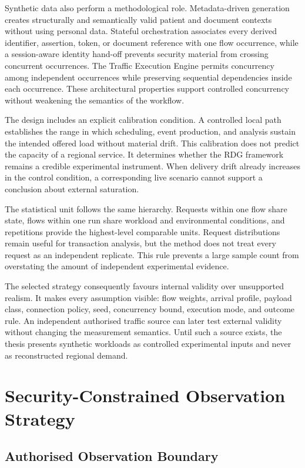 \noindent Synthetic data also perform a methodological role. Metadata-driven generation
creates structurally and semantically valid patient and document contexts without
using personal data. Stateful orchestration associates every derived identifier,
assertion, token, or document reference with one flow occurrence, while a
session-aware identity hand-off prevents security material from crossing
concurrent occurrences. The Traffic Execution Engine permits concurrency
among independent occurrences while preserving sequential dependencies inside
each occurrence. These architectural properties support controlled concurrency
without weakening the semantics of the workflow.

\noindent The design includes an explicit calibration condition. A controlled local path
establishes the range in which scheduling, event production, and analysis sustain
the intended offered load without material drift. This calibration does not
predict the capacity of a regional service. It determines whether the RDG
framework remains a credible experimental instrument. When delivery drift
already increases in the control condition, a corresponding live scenario cannot
support a conclusion about external saturation.

\noindent The statistical unit follows the same hierarchy. Requests within one flow share
state, flows within one run share workload and environmental conditions, and
repetitions provide the highest-level comparable units. Request distributions
remain useful for transaction analysis, but the method does not treat every
request as an independent replicate. This rule prevents a large sample count from
overstating the amount of independent experimental evidence.

\noindent The selected strategy consequently favours internal validity over unsupported
realism. It makes every assumption visible: flow weights, arrival profile,
payload class, connection policy, seed, concurrency bound, execution mode, and
outcome rule. An independent authorised traffic source can later test external
validity without changing the measurement semantics. Until such a source exists,
the thesis presents synthetic workloads as controlled experimental inputs and
never as reconstructed regional demand.

\section{Security-Constrained Observation Strategy}
\subsection{Authorised Observation Boundary}

